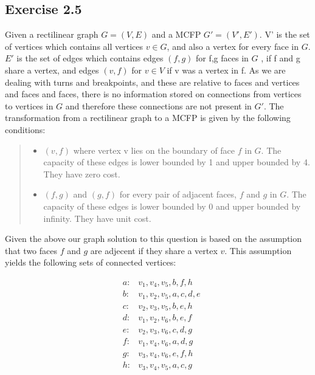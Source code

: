 \subsection{Exercise 2.5}
Given a rectilinear graph \(G = (V,E)\) and a MCFP \(G' = (V',E')\). V'  is the set of vertices which contains all vertices \(v \in G\), and also a vertex for every face in \(G\).  \(E'\) is the set of edges which contains edges \((f,g)\) for f,g faces in \(G\) , if f and g share a vertex, and edges \((v,f)\) for \(v \in V\) if v was a vertex in f. As we are dealing with turns and breakpoints, and these are relative to faces and vertices and faces and faces, there is no information stored on connections from vertices to vertices in \(G\) and therefore these connections are not present in \(G'\). 
The transformation from a rectilinear graph to a MCFP is given by the following conditions:
\begin{quote}
  \begin{itemize}
    \item{} \((v,f)\) where vertex v lies on the boundary of face \(f\) in \(G\). The capacity of these
        edges is lower bounded by 1 and upper bounded by 4. They have zero cost.
    \item{} \((f,g)\) and \((g,f)\) for every pair of adjacent faces, \(f\) and \(g\) in \(G\). The capacity of these edges is lower bounded by 0 and upper bounded by infinity. They have unit cost.
  \end{itemize}
\end{quote}

Given the above our graph solution to this question is based on the assumption that two faces \(f\) and \(g\) are adjecent if they share a vertex \(v\). This assumption yields the following sets of connected vertices:

\begin{align}
  &a:& {v_1, v_4, v_5, b, f, h}\\
  &b:& {v_1, v_2, v_5, a, c, d, e}\\
  &c:& {v_2, v_3, v_5, b, e, h}\\
  &d:& {v_1, v_2, v_6, b, e, f}\\
  &e:& {v_2, v_3, v_6, c, d, g}\\
  &f:& {v_1, v_4, v_6, a, d, g}\\
  &g:& {v_3, v_4, v_6, e, f, h}\\
  &h:& {v_3, v_4, v_5, a, c, g}
\end{align}

